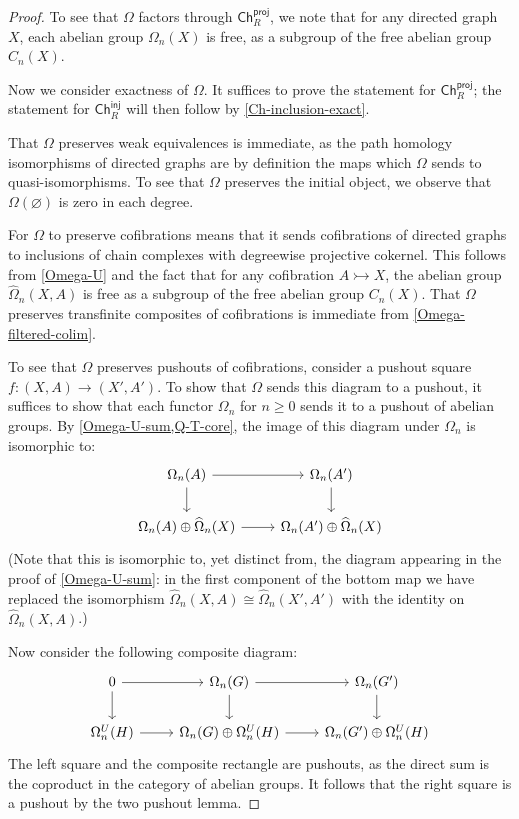 \documentclass[11pt]{article}
\theoremstyle{definition}
\numberwithin{equation}{section}
\newcommand{\Ch}{\mathsf{Ch}}
\newcommand{\tOmega}{\widehat{\Omega}}
\newcommand{\inj}{\mathsf{inj}}
\newcommand{\proj}{\mathsf{proj}}
\newcommand{\cto}{\rightarrowtail}
\begin{document}
\begin{proof}
To see that $\Omega$ factors through $\Ch^{\proj}_R$, we note that for any directed graph $X$, each abelian group $\Omega_n(X)$ is free, as a subgroup of the free abelian group $C_n(X)$.

Now we consider exactness of $\Omega$. It suffices to prove the statement for $\Ch^\proj_R$; the statement for $\Ch^\inj_R$ will then follow by \cref{Ch-inclusion-exact}. 

That $\Omega$ preserves weak equivalences is immediate, as the path homology isomorphisms of directed graphs are by definition the maps which $\Omega$ sends to quasi-isomorphisms.
To see that $\Omega$ preserves the initial object, we observe that $\Omega(\varnothing)$ is zero in each degree.

For $\Omega$ to preserve cofibrations means that it sends cofibrations of directed graphs to inclusions of chain complexes with degreewise projective cokernel. This follows from \cref{Omega-U} and the fact that for any cofibration $A \cto X$, the abelian group $\tOmega_n(X,A)$ is free as a subgroup of the free abelian group $C_n(X)$. That $\Omega$ preserves transfinite composites of cofibrations is immediate from \cref{Omega-filtered-colim}.

To see that $\Omega$ preserves pushouts of cofibrations, consider a pushout square $f \colon (X,A) \to (X',A')$. To show that $\Omega$ sends this diagram to a pushout, it suffices to show that each functor $\Omega_n$ for $n \geq 0$ sends it to a pushout of abelian groups. By \cref{Omega-U-sum,Q-T-core}, the image of this diagram under $\Omega_n$ is isomorphic to:
\[
\begin{tikzcd}
\Omega_n(A) \arrow[r] \arrow[d] & \Omega_n(A') \arrow[d] \\
\Omega_n(A) \oplus \tOmega_n(X) \arrow[r] & \Omega_n(A') \oplus \tOmega_n(X)
\end{tikzcd}
\]
(Note that this is isomorphic to, yet distinct from, the diagram appearing in the proof of \cref{Omega-U-sum}: in the first component of the bottom map we have replaced the isomorphism $\tOmega_n(X,A) \cong \tOmega_n(X',A')$ with the identity on $\tOmega_n(X,A)$.)

Now consider the following composite diagram:
\[
\begin{tikzcd}
0 \arrow[r] \arrow[d] & \Omega_n(G) \arrow[r] \arrow[d] & \Omega_n(G') \arrow[d] \\
\Omega_n^U(H) \arrow[r] & \Omega_n(G) \oplus \Omega_n^U(H) \arrow[r] & \Omega_n(G') \oplus \Omega_n^U(H)
\end{tikzcd}
\]
The left square and the composite rectangle are pushouts, as the direct sum is the coproduct in the category of abelian groups. It follows that the right square is a pushout by the two pushout lemma.
\end{proof}
\end{document}
